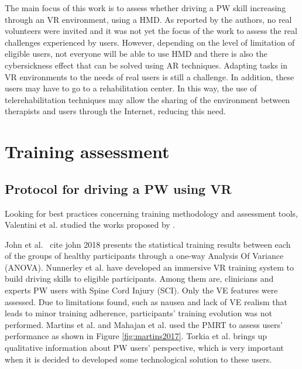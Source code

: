 The main focus of this work is to assess whether driving a PW skill increasing through an VR environment, using a HMD. As reported by the authors, no real volunteers were invited and it was not yet the focus of the work to assess the real challenges experienced by users. However, depending on the level of limitation of eligible users, not everyone will be able to use HMD and there is also the cybersickness effect that can be solved using AR techniques. Adapting tasks in VR environments to the needs of real users is still a challenge. In addition, these users may have to go to a rehabilitation center. In this way, the use of telerehabilitation techniques may allow the sharing of the environment between therapists and users through the Internet, reducing this need.

\section{Training assessment}
\label{sec:trainingassess}
\subsection{Protocol for driving a PW using VR}
Looking for best practices concerning training methodology and assessment tools, Valentini et al. \cite{valentini2019} studied the works proposed by \cite{john2018,martins2017,nunnerley2017, torkia2015,mahajan2013}.

John et al. \ cite {john 2018} presents the statistical training results between each of the groups of healthy participants through a one-way Analysis Of Variance (ANOVA). Nunnerley et al. \cite{nunnerley2017} have developed an immersive VR training system to build driving skills to eligible participants. Among them are, clinicians and experts PW users with Spine Cord Injury (SCI). Only the VE features were assessed. Due to limitations found, such as nausea and lack of VE realism that leads to minor training adherence, participants' training evolution was not performed. Martins et al. \cite{martins2017} and Mahajan et al. \cite{mahajan2013} used the PMRT to assess users' performance as shown in Figure \ref {fig:martins2017}. Torkia et al. \cite{torkia2015} brings up qualitative information about PW users' perspective, which is very important when it is decided to developed some technological solution to these users.


